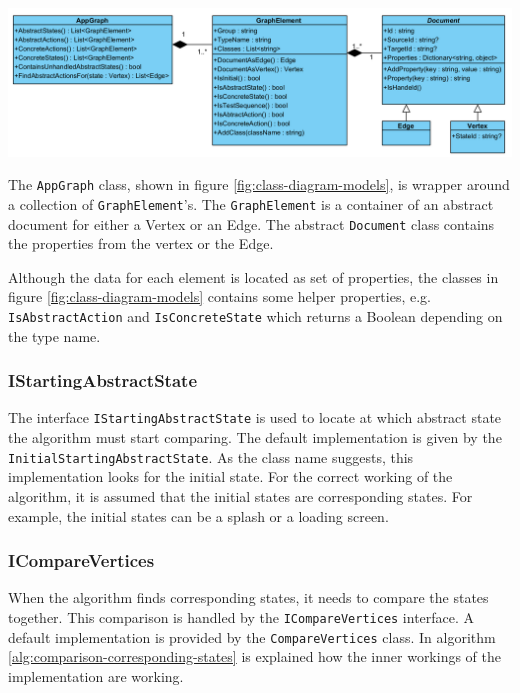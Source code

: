 \begingroup
\captionsetup{type=figure}
\includegraphics[scale=0.6]{images/4-UML-Models.png}
\label{fig:class-diagram-models}
\endgroup

The \verb|AppGraph| class, shown in figure \ref{fig:class-diagram-models}, is wrapper around a collection of \verb|GraphElement|'s. The \verb|GraphElement| is a container of an abstract document for either a Vertex or an Edge. The abstract \verb|Document| class contains the properties from the vertex or the Edge.

Although the data for each element is located as set of properties, the classes in figure \ref{fig:class-diagram-models} contains some helper properties, e.g. \verb|IsAbstractAction| and \verb|IsConcreteState| which returns a Boolean depending on the type name. 

\subsubsection{IStartingAbstractState} \label{sec:starting-abstract-state}
The interface \verb|IStartingAbstractState| is used to locate at which abstract state the algorithm must start comparing. The default implementation is given by the \verb|InitialStartingAbstractState|. As the class name suggests, this implementation looks for the initial state. For the correct working of the algorithm, it is assumed that the initial states are corresponding states. For example, the initial states can be a splash or a loading screen.

\subsubsection{ICompareVertices} \label{sec:i-compare-vertices}
When the algorithm finds corresponding states, it needs to compare the states together. This comparison is handled by the \verb|ICompareVertices| interface. A default implementation is provided by the \verb|CompareVertices| class. In algorithm \ref{alg:comparison-corresponding-states} is explained how the inner workings of the implementation are working.  


